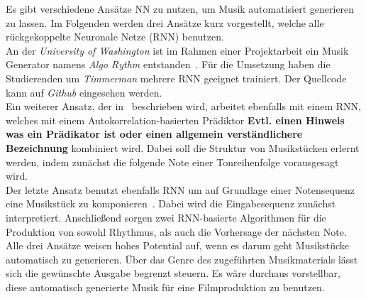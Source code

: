 \documentclass[times, 11pt,twocolumn]{article}
\begin{document}
 \label{sec:SOTAProduktion}
Es gibt verschiedene Ansätze NN zu nutzen, um Musik automatisiert generieren zu lassen. Im Folgenden werden drei Ansätze kurz vorgestellt, welche alle rückgekoppelte Neuronale Netze (RNN) benutzen. \\
An der \textit{University of Washington} ist im Rahmen einer Projektarbeit ein Musik Generator namens \textit{Algo Rythm} entstanden~\cite{Algorithm}. Für die Umsetzung haben die Studierenden um \textit{Timmerman} mehrere RNN geeignet trainiert. Der Quellcode kann auf \textit{Github} \cite{AlgorithmGit} eingesehen werden.\\
Ein weiterer Ansatz, der in~\cite{eck+lapalme:2008} beschrieben wird, arbeitet ebenfalls mit einem RNN, welches mit einem Autokorrelation-basierten Prädiktor \textbf{Evtl. einen Hinweis was ein Prädikator ist oder einen allgemein verständlichere Bezeichnung} kombiniert wird. Dabei soll die Struktur von Musikstücken erlernt werden, indem zunächst die folgende Note einer Tonreihenfolge vorausgesagt wird. \\
Der letzte Ansatz benutzt ebenfalls RNN um auf Grundlage einer Notensequenz eine Musikstück zu komponieren~\cite{browne2001system}. Dabei wird die Eingabesequenz zunächst interpretiert. Anschließend sorgen zwei RNN-basierte Algorithmen für die Produktion von sowohl Rhythmus, als auch die Vorhersage der nächsten Note. \\

Alle drei Ansätze weisen hohes Potential auf, wenn es darum geht Musikstücke automatisch zu generieren. Über das Genre des zugeführten Musikmaterials lässt sich die gewünschte Ausgabe begrenzt steuern. Es wäre durchaus vorstellbar, diese automatisch generierte Musik für eine Filmproduktion zu benutzen.
\end{document}
